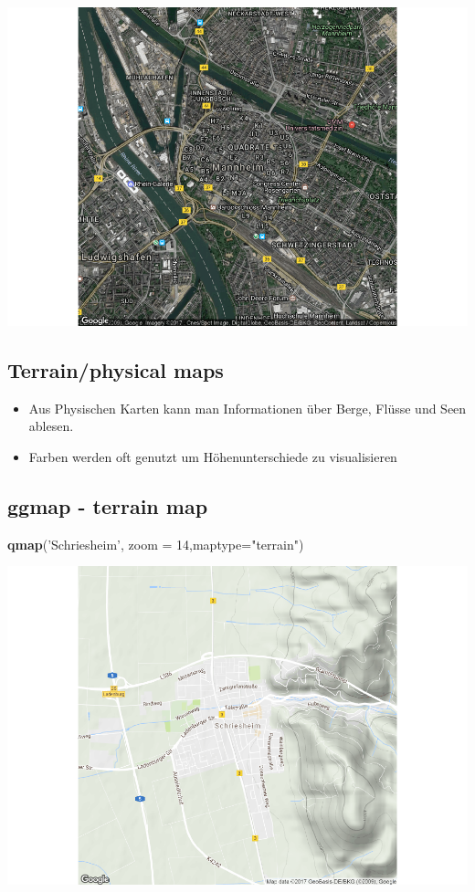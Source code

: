 \documentclass[]{article}
\newenvironment{Shaded}{\begin{snugshade}}{\end{snugshade}}
\newcommand{\KeywordTok}[1]{\textcolor[rgb]{0.13,0.29,0.53}{\textbf{{#1}}}}
\newcommand{\DataTypeTok}[1]{\textcolor[rgb]{0.13,0.29,0.53}{{#1}}}
\newcommand{\DecValTok}[1]{\textcolor[rgb]{0.00,0.00,0.81}{{#1}}}
\newcommand{\StringTok}[1]{\textcolor[rgb]{0.31,0.60,0.02}{{#1}}}
\newcommand{\NormalTok}[1]{{#1}}
\begin{document}
\includegraphics{Intro_Datenanalyse1_files/figure-latex/unnamed-chunk-250-1.pdf}

\subsection{Terrain/physical maps}\label{terrainphysical-maps}

\begin{itemize}
\item
  Aus Physischen Karten kann man Informationen über Berge, Flüsse und
  Seen ablesen.
\item
  Farben werden oft genutzt um Höhenunterschiede zu visualisieren
\end{itemize}

\subsection{ggmap - terrain map}\label{ggmap---terrain-map}

\begin{Shaded}
\begin{Highlighting}[]
\KeywordTok{qmap}\NormalTok{(}\StringTok{'Schriesheim'}\NormalTok{, }\DataTypeTok{zoom =} \DecValTok{14}\NormalTok{,}\DataTypeTok{maptype=}\StringTok{"terrain"}\NormalTok{)}
\end{Highlighting}
\end{Shaded}

\includegraphics{Intro_Datenanalyse1_files/figure-latex/unnamed-chunk-251-1.pdf}
\end{document}
